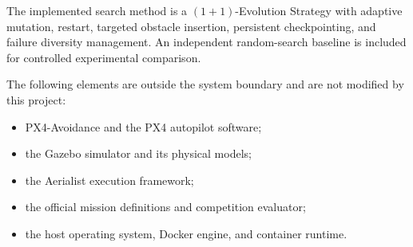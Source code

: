\documentclass[11pt,a4paper]{report}
\begin{document}
The implemented search method is a $(1+1)$-Evolution Strategy with adaptive mutation, restart, targeted obstacle insertion, persistent checkpointing, and failure diversity management. An independent random-search baseline is included for controlled experimental comparison.

The following elements are outside the system boundary and are not modified by this project:
\begin{itemize}
  \item PX4-Avoidance and the PX4 autopilot software;
  \item the Gazebo simulator and its physical models;
  \item the Aerialist execution framework;
  \item the official mission definitions and competition evaluator;
  \item the host operating system, Docker engine, and container runtime.
\end{itemize}
\end{document}
